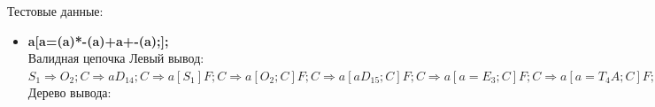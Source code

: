 \documentclass[a4paper,14pt]{extarticle}
\begin{document}
\begin{enumerate}[1.]
    Тестовые данные:
    \begin{itemize}
        \item \textbf{a[a=(a)*-(a)+a+-(a);];}\\
        Валидная цепочка\bigbreak
        Левый вывод:\\
        $S_{1} \Rightarrow O_{2};C \Rightarrow aD_{14};C \Rightarrow a[S_{1}]F;C \Rightarrow a[O_{2};C]F;C \Rightarrow 
        a[aD_{15};C]F;C \Rightarrow a[a=E_{3};C]F;C \Rightarrow a[a=T_{4}A;C]F;C \Rightarrow 
        a[a=P_{5}BA;C]F;C \Rightarrow a[a=(E_{3})BA;C]F;C \Rightarrow a[a=(T_{4}A)BA;C]F;C \Rightarrow 
        a[a=(P_{7}BA)BA;C]F;C \Rightarrow a[a=(aB_{11}A)BA;C]F;C \Rightarrow 
        a[a=(aA_{9})BA;C]F;C \Rightarrow a[a=(a)B_{10}A;C]F;C \Rightarrow 
        a[a=(a)*P_{6}BA;C]F;C \Rightarrow a[a=(a)*-(E_{3})BA;C]F;C \Rightarrow
        a[a=(a)*-(T_{4}A)BA;C]F;C \Rightarrow a[a=(a)*-(P_{7}BA)BA;C]F;C \Rightarrow 
        a[a=(a)*-(aB_{11}A)BA;C]F;C \Rightarrow a[a=(a)*-(aA_{9})BA;C]F;C \Rightarrow
        a[a=(a)*-(a)B_{11}A;C]F;C \Rightarrow a[a=(a)*-(a)A_{8};C]F;C \Rightarrow
        a[a=(a)*-(a)+T_{4}A;C]F;C \Rightarrow a[a=(a)*-(a)+P_{7}BA;C]F;C \Rightarrow
        a[a=(a)*-(a)+aB_{11}A;C]F;C \Rightarrow a[a=(a)*-(a)+aA_{9};C]F;C \Rightarrow
        a[a=(a)*-(a)+a;C_{13}]F;C \Rightarrow a[a=(a)*-(a)+a;]F_{17};C \Rightarrow
        a[a=(a)*-(a)+a;];C_{13} \Rightarrow a[a=(a)*-(a)+a;];$
    \bigbreak
    Дерево вывода:\\

\end{itemize}
\end{enumerate}
\end{document}
